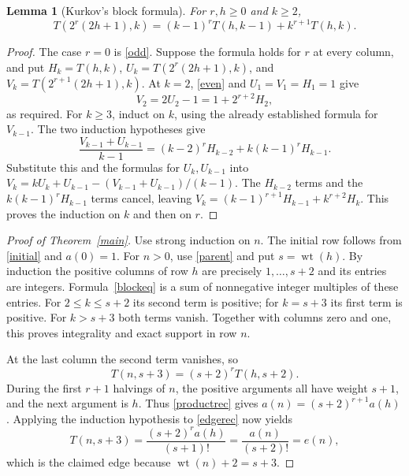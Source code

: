 \documentclass[11pt]{article}
\newcommand{\wt}{\operatorname{wt}}
\newtheorem{lemma}[theorem]{Lemma}
\begin{document}
\begin{lemma}[Kurkov's block formula]\label{block}
For $r,h\geq0$ and $k\geq2$,
\begin{equation}\label{blockeq}
 T(2^r(2h+1),k)=(k-1)^rT(h,k-1)+k^{r+1}T(h,k).
\end{equation}
\end{lemma}
\begin{proof}
The case $r=0$ is \eqref{odd}. Suppose the formula holds for $r$
at every column, and put $H_k=T(h,k)$,
$U_k=T(2^r(2h+1),k)$, and $V_k=T(2^{r+1}(2h+1),k)$.
At $k=2$, \eqref{even} and $U_1=V_1=H_1=1$ give
\[
 V_2=2U_2-1=1+2^{r+2}H_2,
\]
as required. For $k\geq3$, induct on $k$, using the already established
formula for $V_{k-1}$. The two induction hypotheses give
\[
 \frac{V_{k-1}+U_{k-1}}{k-1}
 =(k-2)^rH_{k-2}+k(k-1)^rH_{k-1}.
\]
Substitute this and the formulas for $U_k,U_{k-1}$ into
$V_k=kU_k+U_{k-1}-(V_{k-1}+U_{k-1})/(k-1)$.
The $H_{k-2}$ terms and the $k(k-1)^rH_{k-1}$ terms cancel, leaving
$V_k=(k-1)^{r+1}H_{k-1}+k^{r+2}H_k$.
This proves the induction on $k$ and then on $r$.
\end{proof}

\begin{proof}[Proof of Theorem~\ref{main}]
Use strong induction on $n$. The initial row follows from
\eqref{initial} and $a(0)=1$. For $n>0$, use \eqref{parent} and put
$s=\wt(h)$. By induction the positive columns of row $h$ are precisely
$1,\ldots,s+2$ and its entries are integers. Formula~\eqref{blockeq}
is a sum of nonnegative integer multiples of these entries.
For $2\leq k\leq s+2$ its second term is positive; for $k=s+3$
its first term is positive. For $k>s+3$ both terms vanish.
Together with columns zero and one, this proves integrality and exact
support in row $n$.

At the last column the second term vanishes, so
\begin{equation}\label{edgerec}
 T(n,s+3)=(s+2)^r T(h,s+2).
\end{equation}
During the first $r+1$ halvings of $n$, the positive arguments all have
weight $s+1$, and the next argument is $h$. Thus \eqref{productrec} gives
$a(n)=(s+2)^{r+1}a(h)$. Applying the induction hypothesis to
\eqref{edgerec} now yields
\[
 T(n,s+3)=\frac{(s+2)^ra(h)}{(s+1)!}
          =\frac{a(n)}{(s+2)!}=e(n),
\]
which is the claimed edge because $\wt(n)+2=s+3$.
\end{proof}
\end{document}
